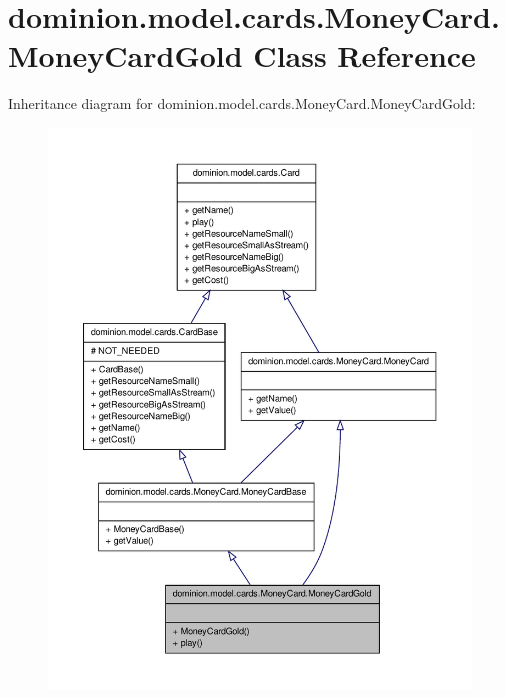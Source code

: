 \hypertarget{classdominion_1_1model_1_1cards_1_1MoneyCard_1_1MoneyCardGold}{\section{dominion.\-model.\-cards.\-Money\-Card.\-Money\-Card\-Gold \-Class \-Reference}
\label{classdominion_1_1model_1_1cards_1_1MoneyCard_1_1MoneyCardGold}
}


\-Inheritance diagram for dominion.\-model.\-cards.\-Money\-Card.\-Money\-Card\-Gold\-:
\nopagebreak
\begin{figure}[H]
\begin{center}
\leavevmode
\includegraphics[width=350pt]{classdominion_1_1model_1_1cards_1_1MoneyCard_1_1MoneyCardGold__inherit__graph}
\end{center}
\end{figure}


